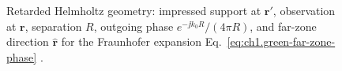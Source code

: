 \begin{figure}[t]
\centering
\VolIPhysFig{\VolIPhysGreenFunctionGeometry}
\caption{Retarded Helmholtz geometry: impressed support at $\mathbf{r}'$, observation at $\mathbf{r}$, separation $R$, outgoing phase $e^{-\jj k_0 R}/(4\pi R)$, and far-zone direction $\hat{\mathbf{r}}$ for the Fraunhofer expansion Eq.~\eqref{eq:ch1.green-far-zone-phase} \cite{stratton1941,jackson1999}.}
\label{fig:ch1.green-function-seed}
\end{figure}